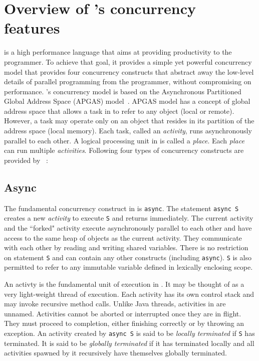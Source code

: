 \section{Overview of \xten's concurrency features}

\xten is a high performance language that aims at providing productivity to the
programmer. To achieve that goal, it provides a simple yet powerful concurrency
model that provides four concurrency constructs that abstract away the low-level
details of parallel programming from the programmer, without compromising on
performance. \xten's concurrency model is based on the Asynchronous Partitioned
Global Address Space (APGAS) model~\cite{apgaspaper}. APGAS model has a concept
of global address space that allows a task in \xten to refer to any object
(local or remote). However, a task may operate only on an object that resides in
its partition of the address space (local memory). Each task, called an
\emph{activity}, runs asynchronously parallel to each other. A logical
processing unit in \xten is called a \emph{place}. Each \emph{place} can run
multiple \emph{activities}.    
Following four types of concurrency constructs are provided by
\xten~\cite{x10intro}:

\subsection{Async} The fundamental concurrency construct in \xten is
\texttt{async}. The statement \texttt{async S} creates a new \emph{activity} to
execute \texttt{S} and returns immediately. The current activity and the
``forked" activity execute asynchronously parallel to each other and have access
to the same heap of objects as the current activity. They communicate with each
other by reading and writing shared variables. There is no restriction on
statement \texttt{S} and can contain any other constructs (including
\texttt{async}). \texttt{S} is also permitted to refer to any immutable variable
defined in lexically enclosing scope.

An activty is
the fundamental unit of execution in \xten. It may be thought of as a very
light-weight thread of execution. Each activity has its own control stack and
may invoke recursive method calls. Unlike Java threads, activities in \xten are
unnamed. Activities cannot be aborted or interrupted once they are in flight.
They must proceed to completion, either finishing correctly or by throwing an
exception. An activity created by \texttt{async S} is said to be \emph{locally
terminated} if \texttt{S} has terminated. It is said to be \emph{globally
terminated} if it has terminated locally and all activities spawned by it
recursively have themselves globally terminated.
   

